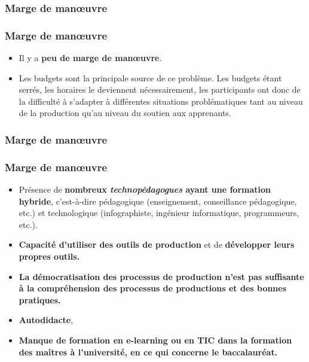 					\subsubsection{Marge de manœuvre} 
						\begin{frame}[allowframebreaks]
						\frametitle{Marge de manœuvre}
                        			
                        			\begin{itemize}
                        			\item Il y a \textbf{peu de marge de manœuvre}. 
                        			\item Les budgets sont la principale source de ce problème. Les budgets étant serrés, les horaires le deviennent nécessairement, les participants ont donc de la difficulté à s’adapter à différentes situations problématiques tant au niveau de la production qu’au niveau du soutien aux apprenants.
                        				
						\end{itemize}
						\end{frame}	
						
					\subsubsection{Marge de manœuvre} 
						\begin{frame}[allowframebreaks]
						\frametitle{Marge de manœuvre}
                        			
                        			\begin{itemize}
                        			\item Présence de \textbf{nombreux \textit{technopédagogues} ayant une formation hybride}, c’est-à-dire pédagogique (enseignement, conseillance pédagogique, etc.) et technologique (infographiste, ingénieur informatique, programmeurs, etc.). 
                        			\item \textbf{Capacité d’utiliser des outils de production} et de \textbf{développer leurs propres outils.} 
                        			\item\textbf{La démocratisation des processus de production n’est pas suffisante à la compréhension des processus de productions et des bonnes pratiques.}
						\item \textbf{Autodidacte}, 
						\item \textbf{Manque de formation en e-learning ou en TIC dans la formation des maîtres à l’université, en ce qui concerne le baccalauréat.}

                        				
						\end{itemize}
						\end{frame}	
						
